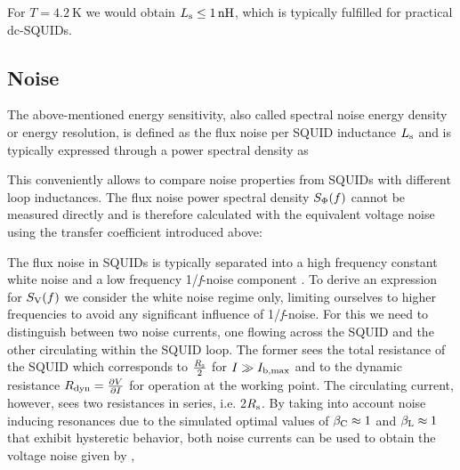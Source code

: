 
For $T=\qty{4.2}{\kelvin}$ we would obtain $L_{\rm s}\leq\qty{1}{n\henry}$, which is typically fulfilled for practical dc-SQUIDs.

\subsection{Noise}
\label{subsec_noise_theo}

The above-mentioned energy sensitivity, also called spectral noise energy density or energy resolution, is defined as the flux noise per SQUID inductance $L_{\rm s}$ and is typically expressed through a power spectral density as 


This conveniently allows to compare noise properties from SQUIDs with different loop inductances. The flux noise power spectral density $S_{\rm \Phi}(f)$ cannot be measured directly and is therefore calculated with the equivalent voltage noise using the transfer coefficient introduced above: 


The flux noise in SQUIDs is typically separated into a high frequency constant white noise and a low frequency 1/\textit{f}-noise component \cite{Koch2007}. To derive an expression for $S_{\rm V}(f)$ we consider the white noise regime only, limiting ourselves to higher frequencies to avoid any significant influence of 1/\textit{f}-noise. For this we need to distinguish between two noise currents, one flowing across the SQUID and the other circulating within the SQUID loop. The former sees the total resistance of the SQUID which corresponds to $\frac{R_{\rm s}}{2}$ for $I\gg I_{\rm b,max}$ and to the dynamic resistance $R_{\rm dyn}=\frac{\partial V}{\partial I}$ for operation at the working point. The circulating current, however, sees two resistances in series, i.e. 2$R_{\rm s}$. By taking into account noise inducing resonances due to the simulated optimal values of $\beta_{\rm C}\approx 1$ and $\beta_{\rm L}\approx 1$ that exhibit hysteretic behavior, both noise currents can be used to obtain the voltage noise given by \cite{Tesche1977}, \cite{Bruines1982}
 
